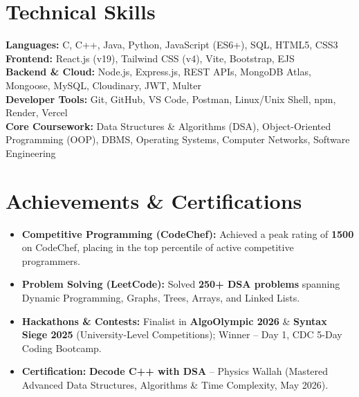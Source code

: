 \documentclass[letterpaper,10.8pt]{article}
\newcommand{\resumeItem}[1]{
  \item\small{
    {#1 \vspace{-2pt}}
  }
}
\newcommand{\resumeItemListStart}{\begin{itemize}[leftmargin=0.15in]}
\newcommand{\resumeItemListEnd}{\end{itemize}\vspace{-4pt}}
\begin{document}
\section{Technical Skills}
 \begin{itemize}[leftmargin=0.15in, label={}]
    \small{\item{
     \textbf{Languages:} C, C++, Java, Python, JavaScript (ES6+), SQL, HTML5, CSS3 \\
     \textbf{Frontend:} React.js (v19), Tailwind CSS (v4), Vite, Bootstrap, EJS \\
     \textbf{Backend \& Cloud:} Node.js, Express.js, REST APIs, MongoDB Atlas, Mongoose, MySQL, Cloudinary, JWT, Multer \\
     \textbf{Developer Tools:} Git, GitHub, VS Code, Postman, Linux/Unix Shell, npm, Render, Vercel \\
     \textbf{Core Coursework:} Data Structures \& Algorithms (DSA), Object-Oriented Programming (OOP), DBMS, Operating Systems, Computer Networks, Software Engineering
    }}
 \end{itemize}
\vspace{-6pt}

\section{Achievements \& Certifications}
 \resumeItemListStart
    \resumeItem{\textbf{Competitive Programming (CodeChef):} Achieved a peak rating of \textbf{1500} on CodeChef, placing in the top percentile of active competitive programmers.}
    \resumeItem{\textbf{Problem Solving (LeetCode):} Solved \textbf{250+ DSA problems} spanning Dynamic Programming, Graphs, Trees, Arrays, and Linked Lists.}
    \resumeItem{\textbf{Hackathons \& Contests:} Finalist in \textbf{AlgoOlympic 2026} \& \textbf{Syntax Siege 2025} (University-Level Competitions); Winner -- Day 1, CDC 5-Day Coding Bootcamp.}
    \resumeItem{\textbf{Certification:} \textbf{Decode C++ with DSA} -- Physics Wallah (Mastered Advanced Data Structures, Algorithms \& Time Complexity, May 2026).}
 \resumeItemListEnd

\end{document}

